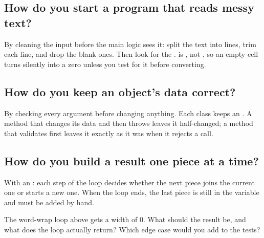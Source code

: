 \label{ch:c26}

\subsection{How do you start a program that reads messy text?}%
By cleaning the input before the main logic sees it: split the text into lines, trim each line, and drop the blank ones. Then look for the .  is , not , so an empty cell turns silently into a zero unless you test for it before converting.

\subsection{How do you keep an object's data correct?}%
By checking every argument before changing anything. Each class keeps an . A method that changes its data and then throws leaves it half-changed; a method that validates first leaves it exactly as it was when it rejects a call.

\subsection{How do you build a result one piece at a time?}%
With an : each step of the loop decides whether the next piece joins the current one or starts a new one. When the loop ends, the last piece is still in the variable and must be added by hand.

\begin{ponder}The word-wrap loop above gets a width of 0. What should the result be, and what does the loop actually return? Which edge case would you add to the tests?\end{ponder}
